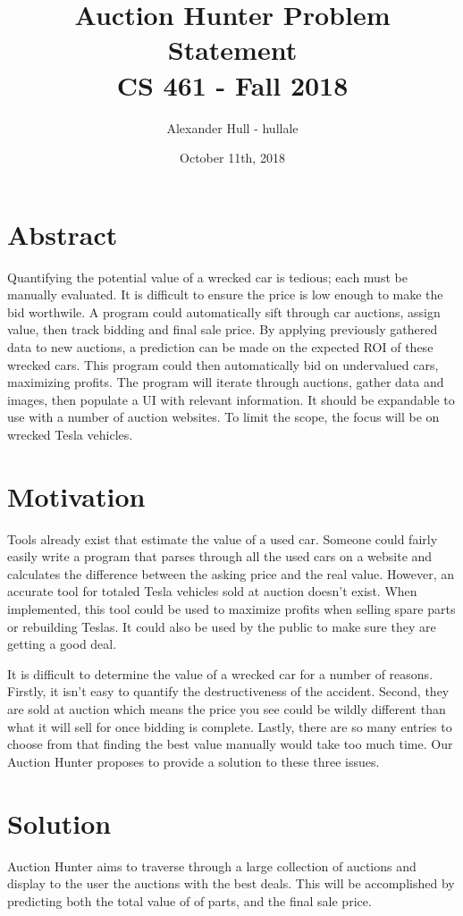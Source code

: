 \documentclass[draftclsnofoot,onecolumn,10pt]{IEEEtran}
\title{Auction Hunter Problem Statement\\CS 461 - Fall 2018}
\author{Alexander Hull - hullale}
\date{October 11th, 2018}
\begin{document}
\maketitle

\singlespacing

\section{Abstract}
Quantifying the potential value of a wrecked car is tedious; each must be manually evaluated. It is difficult to ensure the price is low enough to make the bid worthwile. A program could automatically sift through car auctions, assign value, then track bidding and final sale price. By applying previously gathered data to new auctions, a prediction can be made on the expected ROI of these wrecked cars. This program could then automatically bid on undervalued cars, maximizing profits. The program will iterate through auctions, gather data and images, then populate a UI with relevant information. It should be expandable to use with a number of auction websites. To limit the scope, the focus will be on wrecked Tesla vehicles. 

\newpage

\section{Motivation}
Tools already exist that estimate the value of a used car. Someone could fairly easily write a program that parses through all the used cars on a website and calculates the difference between the asking price and the real value. However, an accurate tool for totaled Tesla vehicles sold at auction doesn't exist. When implemented, this tool could be used to maximize profits when selling spare parts or rebuilding Teslas. It could also be used by the public to make sure they are getting a good deal. 

It is difficult to determine the value of a wrecked car for a number of reasons. Firstly, it isn't easy to quantify the destructiveness of the accident. Second, they are sold at  auction which means the price you see could be wildly different than what it will sell for once bidding is complete. Lastly, there are so many entries to choose from that finding the best value manually would take too much time. Our Auction Hunter proposes to provide a solution to these three issues. 

\section{Solution}
Auction Hunter aims to traverse through a large collection of auctions and display to the user the auctions with the best deals. This will be accomplished by predicting both the total value of of parts, and the final sale price. 
\end{document}
